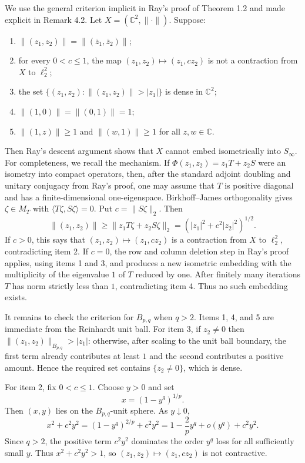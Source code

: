 \documentclass[11pt]{article}
\newcommand{\C}{\mathbb C}
\newcommand{\Sinf}{S_\infty}
\begin{document}
We use the general criterion implicit in Ray's proof of Theorem 1.2 and
made explicit in Remark 4.2.  Let \(X=(\C^2,\|\cdot\|)\).  Suppose:
\begin{enumerate}
\item \(\|(z_1,z_2)\|=\|(\overline z_1,\overline z_2)\|\);
\item for every \(0<c\leq 1\), the map
  \((z_1,z_2)\mapsto (z_1,cz_2)\) is not a contraction from \(X\) to
  \(\ell_2^2\);
\item the set \(\{(z_1,z_2):\|(z_1,z_2)\|>|z_1|\}\) is dense in \(\C^2\);
\item \(\|(1,0)\|=\|(0,1)\|=1\);
\item \(\|(1,z)\|\geq 1\) and \(\|(w,1)\|\geq 1\) for all \(z,w\in\C\).
\end{enumerate}
Then Ray's descent argument shows that \(X\) cannot embed isometrically into
\(\Sinf\).  For completeness, we recall the mechanism.  If
\(\Phi(z_1,z_2)=z_1T+z_2S\) were an isometry into compact operators, then,
after the standard adjoint doubling and unitary conjugacy from Ray's proof,
one may assume that \(T\) is positive diagonal and has a finite-dimensional
one-eigenspace.  Birkhoff--James orthogonality gives
\(\zeta\in M_T\) with \(\langle T\zeta,S\zeta\rangle=0\).  Put
\(c=\|S\zeta\|_2\).  Then
\[
  \|(z_1,z_2)\|\geq
  \|z_1T\zeta+z_2S\zeta\|_2
  =(|z_1|^2+c^2|z_2|^2)^{1/2}.
\]
If \(c>0\), this says that \((z_1,z_2)\mapsto(z_1,cz_2)\) is a contraction
from \(X\) to \(\ell_2^2\), contradicting item 2.  If \(c=0\), the row and
column deletion step in Ray's proof applies, using items 1 and 3, and
produces a new isometric embedding with the multiplicity of the eigenvalue
\(1\) of \(T\) reduced by one.  After finitely many iterations \(T\) has norm
strictly less than \(1\), contradicting item 4.  Thus no such embedding
exists.

It remains to check the criterion for \(B_{p,q}\) when \(q>2\).  Items 1, 4,
and 5 are immediate from the Reinhardt unit ball.  For item 3, if \(z_2\neq0\)
then \(\|(z_1,z_2)\|_{B_{p,q}}>|z_1|\): otherwise, after scaling to the unit
ball boundary, the first term already contributes at least \(1\) and the
second contributes a positive amount.  Hence the required set contains
\(\{z_2\neq0\}\), which is dense.

For item 2, fix \(0<c\leq1\).  Choose \(y>0\) and set
\[
  x=(1-y^q)^{1/p}.
\]
Then \((x,y)\) lies on the \(B_{p,q}\)-unit sphere.  As \(y\downarrow0\),
\[
  x^2+c^2y^2
  =(1-y^q)^{2/p}+c^2y^2
  =1-\frac{2}{p}y^q+o(y^q)+c^2y^2.
\]
Since \(q>2\), the positive term \(c^2y^2\) dominates the order \(y^q\)
loss for all sufficiently small \(y\).  Thus \(x^2+c^2y^2>1\), so
\((z_1,z_2)\mapsto(z_1,cz_2)\) is not contractive.
\end{document}
